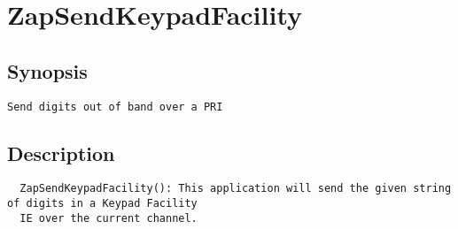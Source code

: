 \section{ZapSendKeypadFacility}
\subsection{Synopsis}
\begin{verbatim}
Send digits out of band over a PRI
\end{verbatim}
\subsection{Description}
\begin{verbatim}
  ZapSendKeypadFacility(): This application will send the given string of digits in a Keypad Facility
  IE over the current channel.

\end{verbatim}


